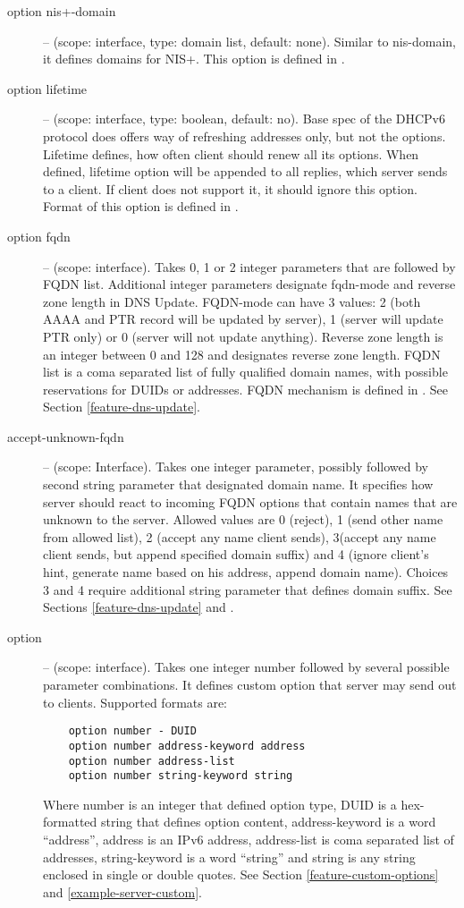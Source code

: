 \begin{description}
 \item[option nis+-domain] -- (scope: interface, type: domain list, default:
   none). Similar to nis-domain, it defines domains for NIS+. This
   option is defined in \cite{rfc3898}.

 \item[option lifetime] -- (scope: interface, type: boolean, default:
   no). Base spec of the DHCPv6 protocol does offers way of refreshing
   addresses only, but not the options. Lifetime defines, how often
   client should renew all its options. When defined, lifetime option
   will be appended to all replies, which server sends to a client. If
   client does not support it, it should ignore this option. Format of
   this option is defined in \cite{rfc4242}.

 \item[option fqdn] -- (scope: interface). Takes 0, 1 or 2 integer
   parameters that are followed by FQDN list. Additional integer
   parameters designate fqdn-mode and reverse zone length in DNS
   Update. FQDN-mode can have 3 values: 2 (both AAAA and PTR record
   will be updated by server), 1 (server will update PTR only) or 
   0 (server will not update anything). Reverse zone length is an
   integer between 0 and 128 and designates reverse zone length. FQDN
   list is a coma separated list of fully qualified domain names, with
   possible reservations for DUIDs or addresses. FQDN mechanism is
   defined in \cite{rfc4704}. See Section \ref{feature-dns-update}.
   
\item[accept-unknown-fqdn] -- (scope: Interface). Takes one integer
  parameter, possibly followed by second string parameter that
  designated domain name. It specifies how server should react to
  incoming FQDN options that contain names that are unknown to the
  server. Allowed values are 0 (reject), 1 (send other name from
  allowed list), 2 (accept any name client sends), 3(accept any name
  client sends, but append specified domain suffix) and 4 (ignore
  client's hint, generate name based on his address, append domain
  name). Choices 3 and 4 require additional string parameter that
  defines domain suffix. See Sections \ref{feature-dns-update}
  and \label{example-server-fqdn}.
 
\item[option] -- (scope: interface). Takes one integer number followed
  by several possible parameter combinations. It defines custom
  option that server may send out to clients. Supported formats are:
  \begin{lstlisting}
    option number - DUID
    option number address-keyword address
    option number address-list
    option number string-keyword string
  \end{lstlisting}
Where number is an integer that defined option type, DUID is a
hex-formatted string that defines option content, address-keyword is a
word ``address'', address is an IPv6 address, address-list is coma
separated list of addresses, string-keyword is a word ``string'' and
string is any string enclosed in single or double quotes. See Section
\ref{feature-custom-options} and \ref{example-server-custom}.


\end{description}

